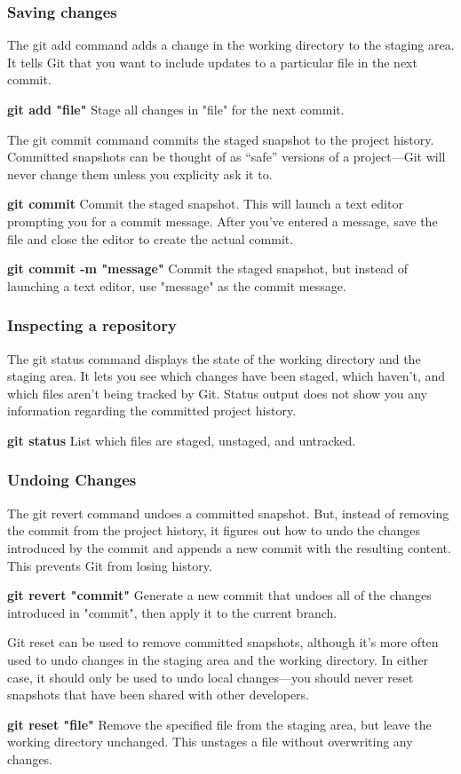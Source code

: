 \documentclass{beamer}
\begin{document}
\begin{frame}
\frametitle{Saving changes}
	The git add command adds a change in the working directory to the staging area. It tells Git that you want to include updates to a particular file in the next commit.

		\textbf{git add "file"}
		Stage all changes in "file" for the next commit.
	
	
		The git commit command commits the staged snapshot to the project history. Committed snapshots can be thought of as “safe” versions of a project—Git will never change them unless you explicity ask it to. 

		\textbf{git commit}
		Commit the staged snapshot. This will launch a text editor prompting you for a commit message. After you’ve entered a message, save the file and close the editor to create the actual commit. 

		\textbf{git commit -m "message"}
		Commit the staged snapshot, but instead of launching a text editor, use "message" as the commit message.
\end{frame}



\begin{frame}
\frametitle{Inspecting a repository}

	    The git status command displays the state of the working directory and the staging area. It lets you see which changes have been staged, which haven’t, and which files aren’t being tracked by Git. Status output does not show you any information regarding the committed project history.

		\textbf{git status}
		List which files are staged, unstaged, and untracked.
\end{frame}




\begin{frame}
\frametitle{Undoing Changes}
The git revert command undoes a committed snapshot. But, instead of removing the commit from the project history, it figures out how to undo the changes introduced by the commit and appends a new commit with the resulting content. This prevents Git from losing history.

		\textbf{git revert "commit"}
		Generate a new commit that undoes all of the changes introduced in "commit", then apply it to the current branch.

	
		Git reset can be used to remove committed snapshots, although it’s more often used to undo changes in the staging area and the working directory. In either case, it should only be used to undo local changes—you should never reset snapshots that have been shared with other developers.

		\textbf{git reset "file"}
		Remove the specified file from the staging area, but leave the working directory unchanged. This unstages a file without overwriting any changes.
\end{frame}
\end{document}
